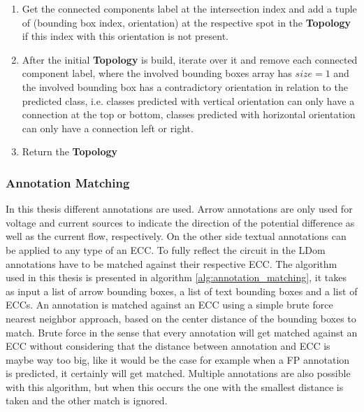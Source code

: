 \begin{enumerate}
    \item Get the connected components label at the intersection index and add a tuple of (bounding box index, orientation) at the respective spot in the \textbf{Topology} if this index with this orientation is not present.
    \item After the initial \textbf{Topology} is build, iterate over it and remove each connected component label, where the involved bounding boxes array has $size = 1$ and the involved bounding box has a contradictory orientation in relation to the predicted class, i.e. classes predicted with vertical orientation can only have a connection at the top or bottom, classes predicted with horizontal orientation can only have a connection left or right.
    \item Return the \textbf{Topology}
\end{enumerate}

\subsubsection{Annotation Matching}

In this thesis different annotations are used.
Arrow annotations are only used for voltage and current sources to indicate the direction of the potential difference as well as the current flow, respectively.
On the other side textual annotations can be applied to any type of an \ac{ECC}.
To fully reflect the circuit in the \ac{LDom} annotations have to be matched against their respective \ac{ECC}.
The algorithm used in this thesis is presented in algorithm \ref{alg:annotation_matching}, it takes as input a list of arrow bounding boxes, a list of text bounding boxes and a list of \acp{ECC}.
An annotation is matched against an \ac{ECC} using a simple brute force nearest neighbor approach, based on the center distance of the bounding boxes to match.
Brute force in the sense that every annotation will get matched against an \ac{ECC} without considering that the distance between annotation and \ac{ECC} is maybe way too big, like it would be the case for example when a \ac{FP} annotation is predicted, it certainly will get matched.
Multiple annotations are also possible with this algorithm, but when this occurs the one with the smallest distance is taken and the other match is ignored.

